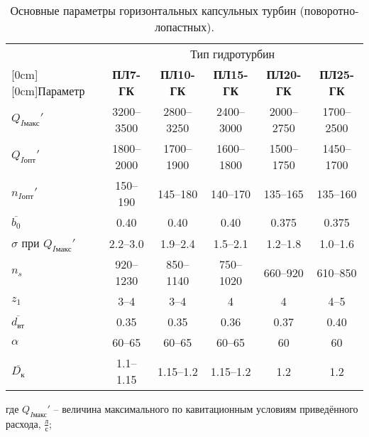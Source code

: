 \renewcommand{\arraystretch}{1.4}
\begin{table}[ht]
\caption{Основные параметры горизонтальных капсульных турбин (поворотно-лопастных).}
\label{tab_7}
\centering

\footnotesize
\begin{tabular}{|l|c|c|c|c|c|}



\hline
    & \multicolumn{5}{c|}{Тип гидротурбин} \\
\cline{2-6}


   \raisebox{1.5ex}[0cm][0cm]{Параметр} & \textbf{ПЛ7-ГК} & \textbf{ПЛ10-ГК} & \textbf{ПЛ15-ГК} & \textbf{ПЛ20-ГК} & \textbf{ПЛ25-ГК}   \\ 

\hline
  $Q_{I\text{макс}}'$ & 3200--3500 & 2800--3250 & 2400--3000 & 2000--2750 & 1700--2500     \\
\hline
  $Q_{I\text{опт}}'$  & 1800--2000 & 1700--1900 & 1600--1800 & 1500--1750 & 1450--1700  \\
\hline
  $n_{I\text{опт}}'$  & 150--190 & 145--180 & 140--170 & 135--165 & 135--160      \\
\hline
  $\overline{b_0}$  & 0.40 & 0.40 & 0.40 & 0.375 & 0.375    \\
\hline
  $\sigma$ при $Q_{I\text{макс}}'$  & 2.2--3.0 & 1.9--2.4 & 1.5--2.1 & 1.2--1.8 & 1.0--1.6    \\

\hline
  $n_s$  & 920--1230 & 850--1140 & 750--1020 & 660--920 & 610--850      \\
\hline
  $z_1$  & 3--4 & 3--4 & 4 & 4 & 4--5    \\

\hline
  $\overline{d_{\text{вт}}}$  & 0.35 & 0.35 & 0.36 & 0.37 & 0.40      \\

\hline
  $\alpha$  & 60--65 & 60--65 & 60--65 & 60 & 60   \\

\hline
  $\overline{D_{\text{к}}}$  & 1.1--1.15 & 1.15--1.2 & 1.15--1.2 & 1.2 & 1.2      \\

\hline
\end{tabular}
\end{table}

где $Q_{I\text{макс}}'$ -- величина максимального по кавитационным условиям приведённого расхода, $\frac{\text{л}}{\text{с}}$; 

\vspace{0.1cm}

